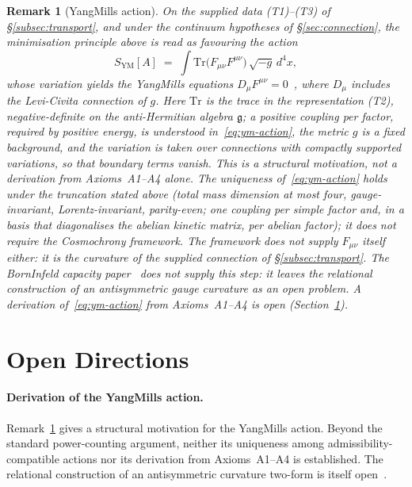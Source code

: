 \documentclass[11pt,a4paper]{article}
\newtheorem{remark}[theorem]{Remark}
\begin{document}
      \begin{remark}[Yang\textendash Mills action]
        \label{rem:ym-action}
        On the supplied data (T1)--(T3) of §\ref{subsec:transport}, and under the continuum hypotheses
        of §\ref{sec:connection}, the minimisation
        principle above is read as favouring the action
        \begin{equation}
          \label{eq:ym-action}
          S_{\mathrm{YM}}[A]
          \;=\; \int \mathrm{Tr}\bigl(F_{\mu\nu} F^{\mu\nu}\bigr)\,\sqrt{-g}\,d^4x,
        \end{equation}
        whose variation yields the Yang\textendash Mills equations $D_\mu F^{\mu\nu} = 0$~\cite{YangMills1954},
        where $D_\mu$ includes the Levi-Civita connection of $g$.
        Here $\mathrm{Tr}$ is the trace in the representation (T2), negative-definite on the
        anti-Hermitian algebra $\mathfrak{g}$; a positive coupling per factor, required by positive
        energy, is understood
        in~\eqref{eq:ym-action}, the metric $g$ is a fixed background, and the variation is taken over
        connections with compactly supported variations, so that boundary terms vanish.
        This is a structural motivation, not a derivation from Axioms~A1--A4 alone.
        The uniqueness of~\eqref{eq:ym-action} holds under the truncation stated above (total mass
        dimension at most four, gauge-invariant, Lorentz-invariant, parity-even; one coupling per
        simple factor and, in a basis that diagonalises the abelian kinetic matrix, per abelian factor);
        it does not
        require the Cosmochrony framework.
        The framework does not supply $F_{\mu\nu}$ itself either: it is the curvature of the supplied
        connection of §\ref{subsec:transport}.
        The Born\textendash Infeld capacity paper~\cite{Beau2026c} does not supply this step:
        it leaves the relational construction of an antisymmetric gauge curvature as an open
        problem.
        A derivation of~\eqref{eq:ym-action} from Axioms~A1--A4 is open
        (Section~\ref{sec:open}).
      \end{remark}

  \section{Open Directions}
  \label{sec:open}

  \paragraph{Derivation of the Yang\textendash Mills action.}
    Remark~\ref{rem:ym-action} gives a structural motivation for the
    Yang\textendash Mills action.
    Beyond the standard power-counting argument, neither its uniqueness among
    admissibility-compatible actions nor its derivation from Axioms~A1--A4 is established.
    The relational construction of an antisymmetric curvature two-form is itself
    open~\cite{Beau2026c}.
\end{document}
